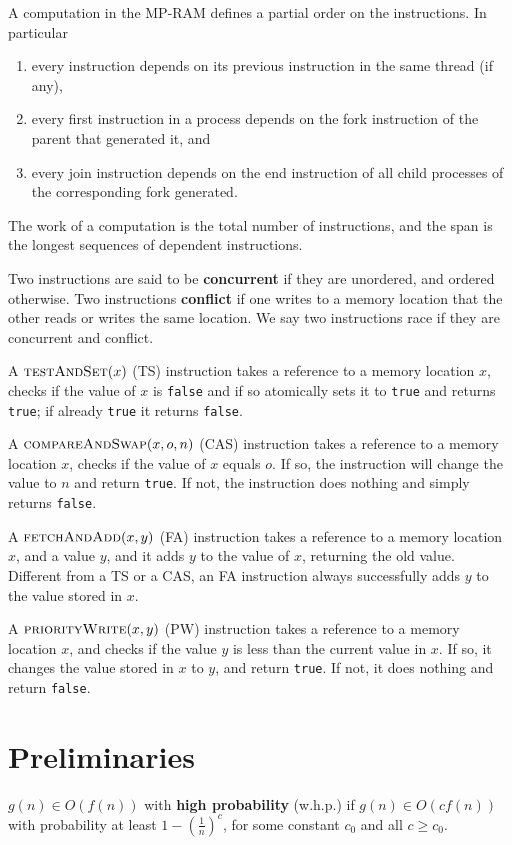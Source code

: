 \documentclass[11pt]{article}
\begin{document}
A computation in the MP-RAM defines a partial order on the instructions. In particular
\begin{enumerate}
\item every instruction depends on its previous instruction in the same thread (if any),
\item every first instruction in a process depends on the fork instruction of the parent that generated
it, and
\item every join instruction depends on the end instruction of all child processes of the corresponding
fork generated.
\end{enumerate}

The work of a computation is the total number of instructions, and the span is the longest sequences
of dependent instructions.

Two instructions are said to be \textbf{concurrent} if they are unordered, and ordered otherwise. Two
instructions \textbf{conflict} if one writes to a memory location that the other reads or writes the same
location. We say two instructions race if they are concurrent and conflict.

A \(\textsc{testAndSet}(x)\) (TS) instruction takes a reference to a memory location \(x\), checks if
the value of \(x\) is \texttt{false} and if so atomically sets it to \texttt{true} and returns \texttt{true}; if already \texttt{true} it
returns \texttt{false}.

A \(\textsc{compareAndSwap}(x, o, n)\) (CAS) instruction takes a reference to a memory location \(x\),
checks if the value of \(x\) equals \(o\). If so, the instruction will change the value to \(n\) and
return \texttt{true}. If not, the instruction does nothing and simply returns \texttt{false}.

A \(\textsc{fetchAndAdd}(x, y)\) (FA) instruction takes a reference to a memory location \(x\), and a
value \(y\), and it adds \(y\) to the value of \(x\), returning the old value. Different from a TS or
a CAS, an FA instruction always successfully adds \(y\) to the value stored in \(x\).

A \(\textsc{priorityWrite}(x, y)\) (PW) instruction takes a reference to a memory location \(x\), and
checks if the value \(y\) is less than the current value in \(x\). If so, it changes the value stored
in \(x\) to \(y\), and return \texttt{true}. If not, it does nothing and return \texttt{false}.
\section{Preliminaries}
\label{sec:orgd0b6421}
\begin{definition}[w.h.p.]
\(g(n)\in O(f(n))\) with \textbf{high probability} (w.h.p.) if \(g(n)\in O(cf(n))\) with probability at least
\(1-(\frac{1}{n})^c\), for some constant \(c_0\) and all \(c\ge c_0\).
\end{definition}
\end{document}
